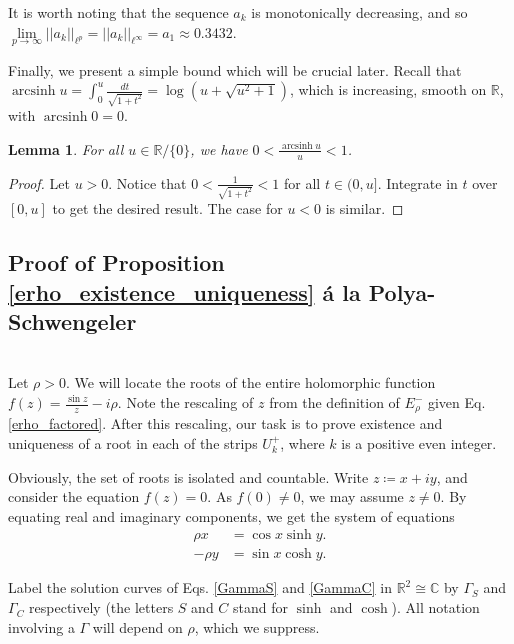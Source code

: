 \documentclass{amsart}
\theoremstyle{plain}
\numberwithin{theorem}{section}
\newtheorem{lemma}[theorem]{Lemma}
\DeclareMathOperator{\arcsinh}{arcsinh}
\theoremstyle{definition}
\theoremstyle{remark}
\theoremstyle{brakets}
\newcommand{\R}{\mathbb{R}}
\newcommand{\C}{\mathbb{C}}
\begin{document}
It is worth noting that the sequence $a_k$ is monotonically decreasing, and so $\lim\limits_{p \to \infty} ||a_k||_{\ell^p} = ||a_k||_{\ell^\infty} = a_1 \approx 0.3432.$ 

Finally, we present a simple bound which will be crucial later. Recall that $\arcsinh u = \int_0^u \frac{dt}{\sqrt{1+t^2}} =  \log( u + \sqrt{u^2 + 1})$, which is increasing, smooth on $\R$, with $\arcsinh 0 = 0$.

\begin{lemma}\label{arcsinhu_overu}
For all $u \in \R / \{0\}$, we have $0 < \frac{\arcsinh u}{u} < 1$.
\end{lemma}
\begin{proof}
    Let $u > 0$. Notice that $0 < \frac{1}{\sqrt{1+t^2}} < 1$ for all $t \in (0,u]$. Integrate in $t$ over $[0,u]$ to get the desired result. The case for $u < 0$ is similar.
\end{proof}






\subsection{Proof of Proposition \ref{erho_existence_uniqueness} \'a la Polya-Schwengeler}
~\\
Let $\rho > 0$. We will locate the roots of the entire holomorphic function $f(z) = \frac{\sin z}{z} - i\rho$. Note the rescaling of $z$ from the definition of $E_\rho^-$ given Eq. \eqref{erho_factored}. After this rescaling, our task is to prove existence and uniqueness of a root in each of the strips $U_k^+$, where $k$ is a positive even integer.

Obviously, the set of roots is isolated and countable. Write $z \coloneq x + iy$, and consider the equation $f(z) = 0$.  As $f(0) \neq 0$, we may assume $z \neq 0$. By equating real and imaginary components, we get the system of equations 
\begin{subequations}
\begin{align}
    \rho x &= \cos x\sinh y. \label{GammaS} \\
    -\rho y &= \sin x\cosh y. \label{GammaC} 
\end{align}
\end{subequations}

Label the solution curves of Eqs. \eqref{GammaS} and \eqref{GammaC} in $\R^2 \cong \C$ by $\Gamma_S$ and $\Gamma_C$ respectively (the letters $S$ and $C$ stand for $\sinh$ and $\cosh$). All notation involving a $\Gamma$ will depend on $\rho$, which we suppress. 
\end{document}
